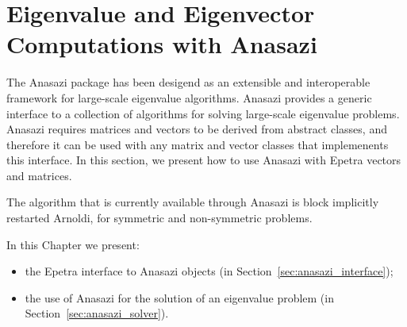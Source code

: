 % 
% 
% 
%   
%   
% 
% 

\section{Eigenvalue and Eigenvector Computations with Anasazi}
\label{chap:anasazi}

The Anasazi package has been desigend as an extensible and interoperable
framework for large-scale eigenvalue algorithms. Anasazi provides a
generic interface to a collection of algorithms for solving large-scale
eigenvalue problems. Anasazi requires matrices and vectors to be derived
from abstract classes, and therefore it can be used with any matrix and
vector classes that implemenents this interface. In this section, we
present how to use Anasazi with Epetra vectors and matrices.

The algorithm that is currently available through Anasazi is block
implicitly restarted Arnoldi, for symmetric and non-symmetric problems.

In this Chapter we present:
\begin{itemize}
\item the Epetra interface to Anasazi objects (in
  Section~\ref{sec:anasazi_interface});
\item the use of Anasazi for the solution of an eigenvalue problem (in
  Section~\ref{sec:anasazi_solver}).
\end{itemize}

